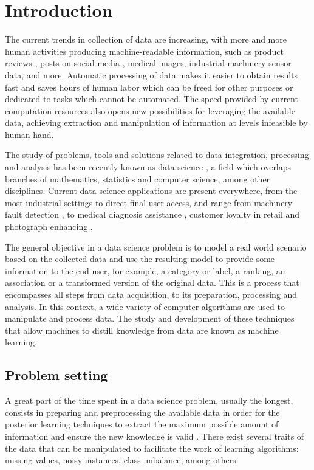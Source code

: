 \setchapterpreamble[u]{\margintoc}
\chapter{Introduction}


The current trends in collection of data are increasing, with more and more human activities producing machine-readable information, such as product reviews , posts on social media , medical images, industrial machinery sensor data, and more. Automatic processing of data makes it easier to obtain  results fast and saves hours of human labor which can be freed for other purposes or dedicated to tasks which cannot be automated. The speed provided by current computation resources also opens new possibilities for leveraging the available data, achieving extraction and manipulation of information at levels infeasible by human hand.

The study of problems, tools and solutions related to data integration, processing and analysis has been recently known as data science , a field which overlaps branches of mathematics, statistics and computer science, among other disciplines. Current data science applications are present everywhere, from the most industrial settings to direct final user access, and range from machinery fault detection , to medical diagnosis assistance , customer loyalty in retail  and photograph enhancing .

The general objective in a data science problem is to model a real world scenario based on the collected data and use the resulting model to provide some information to the end user, for example, a category or label, a ranking, an association or a transformed version of the original data. This is a process that encompasses all steps from data acquisition, to its preparation, processing and analysis. In this context, a wide variety of computer algorithms are used to manipulate and process data. The study and development of these techniques that allow machines to distill knowledge from data are known as machine learning.

\section{Problem setting}

A great part of the time spent in a data science problem, usually the longest, consists in preparing and preprocessing the available data in order for the posterior learning techniques to extract the maximum possible amount of information and ensure the new knowledge is valid . There exist several traits of the data that can be manipulated to facilitate the work of learning algorithms: missing values, noisy instances, class imbalance, among others.

